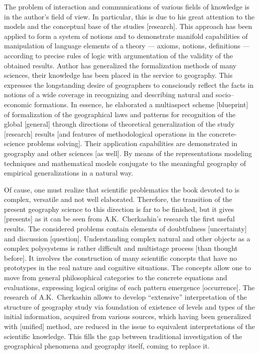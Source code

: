 \documentclass[12pt,leqno]{book}
\begin{document}
The problem of interaction and communications of various fields of knowledge is in the author's field of view. In particular, this is due to his great attention to the models and the conceptual base of the studies [research]. This approach has been applied to form a system of notions and to demonstrate manifold capabilities of manipulation of language elements of a theory --- axioms, notions, definitions --- according to precise rules of logic with argumentation of the validity of the obtained results. Author has generalized the formalization methods of many sciences, their knowledge has been placed in the service to geography. This expresses the longstanding desire of geographers to consciously reflect the facts in notions of a wide coverage in recognizing and describing natural and socio--economic formations. In essence, he elaborated a multiaspect scheme [blueprint] of formalization of the geographical laws and patterns for recognition of the global [general] through directions of theoretical generalization of the study [research] results [and features of methodological operations in the concrete-science problems solving]. Their application capabilities are demonstrated in geography and other sciences [as well]. By means of the representations modeling techniques and mathematical models conjugate to the meaningful geography of empirical generalizations in a natural way.

Of cause, one must realize that scientific problematics the book devoted to is complex, versatile and not well elaborated. Therefore, the transition of the present geography science to this direction is far to be finished, but it gives [presents] as it can be seen from A.K.~Cherkashin's research the first useful results. The considered problems contain elements of doubtfulness [uncertainty] and discussion [question]. Understanding complex natural and other objects as a complex polysystems is rather difficult and multistage process [than thought before]. It involves the construction of many scientific concepts that have no prototypes in the real nature and cognitive situations. The concepts allow one to move from general philosophical categories to the concrete equations and evaluations, expressing logical origins of each pattern emergence [occurrence]. The research of A.K.~Cherkashin allows to develop ``extensive'' interpretation of the structure of geography study via foundation of existence of levels and types of the initial information, acquired from various sources, which having been generalized with [unified] method, are reduced in the issue to equivalent interpretations of the scientific knowledge. This fills the gap between traditional investigation of the geographical phenomena and geography itself, coming to replace it.
\end{document}
